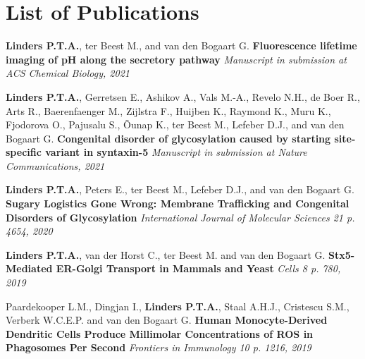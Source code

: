\cleartoleftpage

\section{List of Publications}

\noindent\textbf{Linders P.T.A.}, ter Beest M., and van den Bogaart G.\newline
\noindent\textbf{Fluorescence lifetime imaging of pH along the secretory pathway}\newline
\noindent\emph{Manuscript in submission at ACS Chemical Biology, 2021}

\vspace{\baselineskip}

\noindent\textbf{Linders P.T.A.}, Gerretsen E., Ashikov A., Vals M.-A., Revelo N.H., de Boer R., Arts R., Baerenfaenger M., Zijlstra F., Huijben K., Raymond K., Muru K., Fjodorova O., Pajusalu S., Õunap K., ter Beest M., Lefeber D.J., and van den Bogaart G. \newline
\noindent\textbf{Congenital disorder of glycosylation caused by starting site-specific variant in syntaxin-5} \newline
\noindent\emph{Manuscript in submission at Nature Communications, 2021} 

\vspace{\baselineskip}

\noindent\textbf{Linders P.T.A.}, Peters E., ter Beest M., Lefeber D.J., and van den Bogaart G. \newline
\noindent\textbf{Sugary Logistics Gone Wrong: Membrane Trafficking and Congenital Disorders of Glycosylation} \newline
\noindent\emph{International Journal of Molecular Sciences 21 p. 4654, 2020} 

\vspace{\baselineskip}

\noindent\textbf{Linders P.T.A.}, van der Horst C., ter Beest M. and van den Bogaart G. \newline
\noindent\textbf{Stx5-Mediated ER-Golgi Transport in Mammals and Yeast} \newline
\noindent\emph{Cells 8 p. 780, 2019}

\vspace{\baselineskip}

\noindent Paardekooper L.M., Dingjan I., \textbf{Linders P.T.A.}, Staal A.H.J., Cristescu S.M., Verberk W.C.E.P. and van den Bogaart G. \newline
\noindent\textbf{Human Monocyte-Derived Dendritic Cells Produce Millimolar Concentrations of ROS in Phagosomes Per Second} \newline
\noindent\emph{Frontiers in Immunology 10 p. 1216, 2019}

